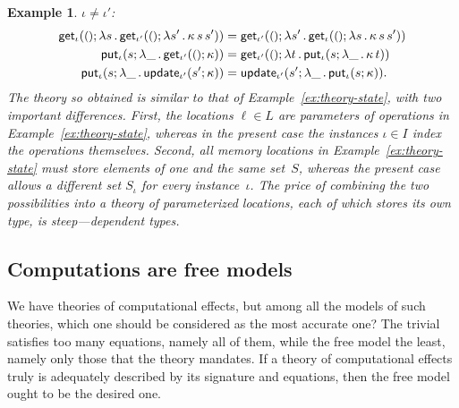 \documentclass{amsart}
\newcommand{\lam}[1]{\lambda #1 \,.\,}
\newcommand{\unit}{{\text{\small$()$}}} %
\newcommand{\kode}[1]{\mathsf{#1}}
\newcommand{\opcall}[3]{\kode{#1}(#2; #3)}
\newtheorem{example}[definition]{Example}
\begin{document}
\begin{example}
  $\iota \neq \iota'$:
  \begin{align*}
    \opcall{get_\iota}{\unit}{
       \lam{s} \opcall{get_{\iota'}}{\unit}{\lam{s'} \kappa \, s \, s'}
    } &=
    \opcall{get_{\iota'}}{\unit}{
       \lam{s'} \opcall{get_\iota}{\unit}{\lam{s} \kappa \, s \, s'}
    }
    \\
    \opcall{put_\iota}{s}{
       \lam{\_} \opcall{get_{\iota'}}{\unit}{\kappa}
    } &=
    \opcall{get_{\iota'}}{\unit}{
       \lam{t} \opcall{put_\iota}{s}{
          \lam{\_} \kappa \, t
       }
    } \\
    \opcall{put_\iota}{s}{
       \lam{\_} \opcall{update_{\iota'}}{s'}{\kappa}
    } &=
    \opcall{update_{\iota'}}{s'}{
       \lam{\_} \opcall{put_\iota}{s}{\kappa}
    }.
  \end{align*}
  The theory so obtained is similar to that of Example~\ref{ex:theory-state},
  with two important differences. First, the locations $\ell \in L$ are
  parameters of operations in Example~\ref{ex:theory-state}, whereas in the
  present case the instances $\iota \in I$ index the operations themselves.
  Second, all memory locations in Example~\ref{ex:theory-state} must store
  elements of one and the same set~$S$, whereas the present case allows a
  different set $S_\iota$ for every instance~$\iota$. The price of combining the
  two possibilities into a theory of parameterized locations, each of which stores
  its own type, is steep---dependent types.
\end{example}

\subsection{Computations are free models}
\label{sec:comp-are-free}

We have theories of computational effects, but among all the models of such
theories, which one should be considered as the most accurate one? The trivial
satisfies too many equations, namely all of them, while the free model the
least, namely only those that the theory mandates. If a theory of computational
effects truly is adequately described by its signature and equations, then the
free model ought to be the desired one.
\end{document}
